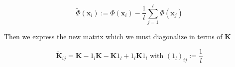 \begin{equation} \label{eq:phi_correction}
\tilde{\Phi}(\textbf{x}_i) := \Phi(\textbf{x}_i) - \frac{1}{l} \sum\limits_{j=1}^l \Phi(\textbf{x}_j)
\end{equation}

Then we express the new matrix which we must diagonalize in terms of \textbf{K}

\begin{equation} \label{eq:phi_correction}
\tilde{\textbf{K}}_{ij} = \textbf{K} - 1_l\textbf{K} - \textbf{K}1_l + 1_l\textbf{K}1_l\text{ with }(1_l)_{ij} := \frac{1}{l}
\end{equation}
